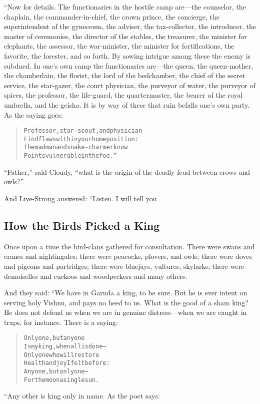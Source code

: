\documentclass[article, twoside, 14pt]{memoir}
\renewenvironment{verbatim}{%
\begin{quote}%
\vskip -10pt%
\begin{alltt}\normalfont\large}{\end{alltt}%
\end{quote}%
\vskip -10pt
} %
\begin{document}
“Now for details. The functionaries in the hostile camp are---the
counselor, the chaplain, the commander-in-chief, the crown prince,
the concierge, the superintendent of the gyneceum, the adviser, the
tax-collector, the introducer, the master of ceremonies, the
director of the stables, the treasurer, the minister for elephants,
the assessor, the war-minister, the minister for fortifications,
the favorite, the forester, and so forth. By sowing intrigue among
these the enemy is subdued. In one's own camp the functionaries
are---the queen, the queen-mother, the chamberlain, the florist,
the lord of the bedchamber, the chief of the secret service, the
star-gazer, the court physician, the purveyor of water, the
purveyor of spices, the professor, the life-guard, the
quartermaster, the bearer of the royal umbrella, and the geisha. It
is by way of these that ruin befalls one's own party. As the saying
goes:

\begin{verbatim}
Professor, star-scout, and physician
Find flaws within your home position:
The madman and snake-charmer know
Points vulnerable in the foe.”
\end{verbatim}
``Father,'' said Cloudy,
``what is the origin of the deadly feud between crows and owls?''

And Live-Strong answered: “Listen. I will tell you

\subsection{How the Birds Picked a King}

\label{s48}

Once upon a time the bird-clans gathered for consultation. There
were swans and cranes and nightingales; there were peacocks,
plovers, and owls; there were doves and pigeons and partridges;
there were bluejays, vultures, skylarks; there were demoiselles and
cuckoos and woodpeckers and many others.

And they said: “We have in Garuda a king, to be sure. But he is
ever intent on serving holy Vishnu, and pays no heed to us. What is
the good of a sham king? He does not defend us when we are in
genuine distress---when we are caught in traps, for instance. There
is a saying:

\begin{verbatim}
Only one, but anyone
Is my king, when all is done--
Only one who will restore
Health and joy I felt before:
Anyone, but only one--
For the moon a single sun.
\end{verbatim}
“Any other is king only in name. As the poet says:
\end{document}
